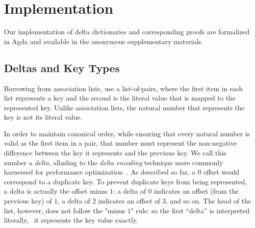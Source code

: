 \section{Implementation}
\label{sec:DD}





Our implementation of delta dictionaries and corresponding proofs are formalized in Agda and available in the anonymous supplementary materials.
%

\subsection{Deltas and Key Types}

Borrowing from association lists, \dds{} use a list-of-pairs, where the first item in each list represents a key and the second is the literal value that is mapped to the represented key.
%
Unlike association lists, the natural number that represents the key is not its literal value.

In order to maintain canonical order, while ensuring that every natural number is valid as the first item in a pair, that number must represent the non-negative difference between the key it represents and the previous key.
%
We call this number a \emph{delta}, alluding to the \emph{delta encoding} technique more commonly harnessed for performance optimization~\citep{XXX}.
%
As described so far, a $0$ offset would correspond to a duplicate key.
%
To prevent duplicate keys from being represented, a delta is actually the offset minus $1$: a delta of $0$ indicates an offset (from the previous key) of $1$, a delta of $2$ indicates an offset of $3$, and so on.
%
The head of the list, however, does not follow the "minus $1$" rule: so the first ``delta'' is interpreted literally, \ie{}~it represents the key value exactly.

